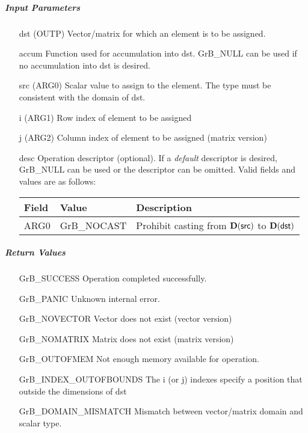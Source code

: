 \subparagraph{Input Parameters}

\begin{itemize}[leftmargin=1.1in]
    \item[{\sf dst}]   ({\sf OUTP}) Vector/matrix for which an element is to be assigned.
    \item[{\sf accum}]  Function used for accumulation into dst.  {\sf GrB\_NULL}
                        can be used if no accumulation into dst is desired.
    \item[{\sf src}]   ({\sf ARG0}) Scalar value to assign to the element.  The type must
                              be consistent with the domain of dst.
    \item[{\sf i}]     ({\sf ARG1}) Row index of element to be assigned
    \item[{\sf j}]     ({\sf ARG2}) Column index of element to be assigned (matrix version)

    \item[{\sf desc}]   Operation descriptor (optional). If a
    \emph{default} descriptor is desired, {\sf GrB\_NULL} can be
    used or the descriptor can be omitted.  Valid fields and values are as follows: \\
    \begin{tabular}{lll}
    Field  & Value & Description \\
    \hline
    {\sf ARG0} & {\sf GrB\_NOCAST} & Prohibit casting from $\bold{D}({\sf src})$ to $\bold{D}({\sf dst})$ \\
    \end{tabular}

\end{itemize}

\subparagraph{Return Values}

\begin{itemize}[leftmargin=2.1in]
\item[{\sf GrB\_SUCCESS}]             Operation completed successfully.
\item[{\sf GrB\_PANIC}]               Unknown internal error.
\item[{\sf GrB\_NOVECTOR}]            Vector does not exist (vector version)
\item[{\sf GrB\_NOMATRIX}]            Matrix does not exist (matrix version)
\item[{\sf GrB\_OUTOFMEM}]            Not enough memory available for operation.
\item[{\sf GrB\_INDEX\_OUTOFBOUNDS}]  The i (or j) indexes specify a position that outside the dimensions of dst
\item[{\sf GrB\_DOMAIN\_MISMATCH}]    Mismatch between vector/matrix domain and scalar type.
\end{itemize}

